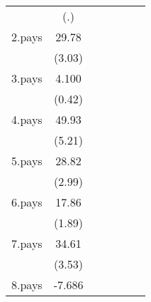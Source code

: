 {\begin{tabular}{l*{6}{c}}
                    &         (.)         &                     &                     &                     &                     &                     \\
[1em]
2.pays              &       29.78\sym{**} &                     &                     &                     &                     &                     \\
                    &      (3.03)         &                     &                     &                     &                     &                     \\
[1em]
3.pays              &       4.100         &                     &                     &                     &                     &                     \\
                    &      (0.42)         &                     &                     &                     &                     &                     \\
[1em]
4.pays              &       49.93\sym{***}&                     &                     &                     &                     &                     \\
                    &      (5.21)         &                     &                     &                     &                     &                     \\
[1em]
5.pays              &       28.82\sym{**} &                     &                     &                     &                     &                     \\
                    &      (2.99)         &                     &                     &                     &                     &                     \\
[1em]
6.pays              &       17.86         &                     &                     &                     &                     &                     \\
                    &      (1.89)         &                     &                     &                     &                     &                     \\
[1em]
7.pays              &       34.61\sym{***}&                     &                     &                     &                     &                     \\
                    &      (3.53)         &                     &                     &                     &                     &                     \\
[1em]
8.pays              &      -7.686         &                     &                     &                     &                     &                     \\

\end{tabular}}
